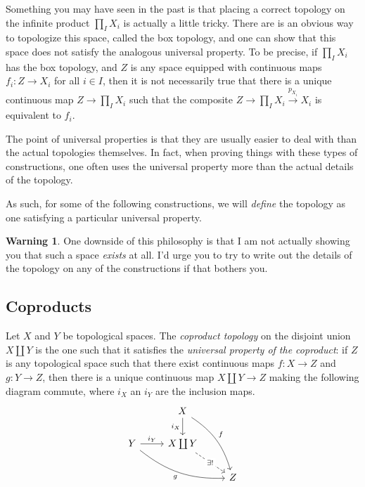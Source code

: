 \documentclass[10pt]{amsart}
\theoremstyle{definition}
\newtheorem{watchout}[thm]{\warning \textbf{Warning} \warning}
\newcommand{\cdef}[1]{\textcolor{Bittersweet}{#1}}
\begin{document}
Something you may have seen in the past is that placing a correct topology on the infinite product $\prod_IX_i$ is actually a little tricky. There are is an obvious way to topologize this space, called the box topology, and one can show that this space does not satisfy the analogous universal property. To be precise, if $\prod_IX_i$ has the box topology, and $Z$ is any space equipped with continuous maps $f_i:Z \to X_i$ for all $i \in I$, then it is not necessarily true that there is a unique continuous map $Z \to \prod_IX_i$ such that the composite $Z \to \prod_IX_i \xrightarrow{p_{X_i}}X_i$ is equivalent to $f_i$.

The point of universal properties is that they are usually easier to deal with than the actual topologies themselves. In fact, when proving things with these types of constructions, one often uses the universal property more than the actual details of the topology. 

As such, for some of the following constructions, we will \emph{define} the topology as one satisfying a particular universal property.

\begin{watchout}
    One downside of this philosophy is that I am not actually showing you that such a space \emph{exists} at all. I'd urge you to try to write out the details of the topology on any of the constructions if that bothers you.
\end{watchout}

\subsection*{Coproducts}
Let $X$ and $Y$ be topological spaces. The \cdef{\emph{coproduct topology}} on the disjoint union $X \coprod Y$ is the one such that it satisfies the \cdef{\emph{universal property of the coproduct}}: if $Z$ is any topological space such that there exist continuous maps $f:X \to Z$ and $g:Y\to Z$, then there is a unique continuous map $X \coprod Y \to Z$ making the following diagram commute, where $i_X$ an $i_Y$ are the inclusion maps.
\[\begin{tikzcd}
	& X \\
	Y & {X\coprod Y} \\
	&& Z
	\arrow["i_X"', from=1-2, to=2-2]
	\arrow["f",bend left = 20, from=1-2, to=3-3]
	\arrow["i_Y",  from=2-1, to=2-2]
	\arrow["g"',bend right = 20, from=2-1, to=3-3]
	\arrow["{\exists!}"{description}, dashed, from=2-2, to=3-3]
\end{tikzcd}\]
\end{document}
